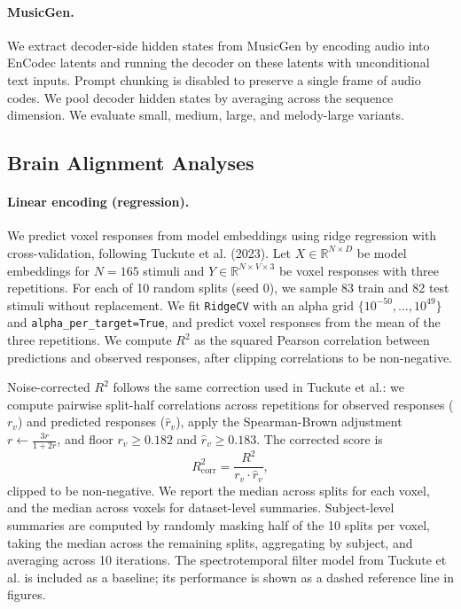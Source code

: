 \paragraph{MusicGen.}
We extract decoder-side hidden states from MusicGen by encoding audio into EnCodec latents and running the decoder on these latents with unconditional text inputs. Prompt chunking is disabled to preserve a single frame of audio codes. We pool decoder hidden states by averaging across the sequence dimension. We evaluate small, medium, large, and melody-large variants.

\subsection{Brain Alignment Analyses}
\paragraph{Linear encoding (regression).}
We predict voxel responses from model embeddings using ridge regression with cross-validation, following Tuckute et al. (2023). Let $X \in \mathbb{R}^{N \times D}$ be model embeddings for $N=165$ stimuli and $Y \in \mathbb{R}^{N \times V \times 3}$ be voxel responses with three repetitions. For each of 10 random splits (seed 0), we sample 83 train and 82 test stimuli without replacement. We fit \texttt{RidgeCV} with an alpha grid $\{10^{-50},\dots,10^{49}\}$ and \texttt{alpha\_per\_target=True}, and predict voxel responses from the mean of the three repetitions. We compute $R^2$ as the squared Pearson correlation between predictions and observed responses, after clipping correlations to be non-negative. 

Noise-corrected $R^2$ follows the same correction used in Tuckute et al.: we compute pairwise split-half correlations across repetitions for observed responses ($r_v$) and predicted responses ($\hat{r}_v$), apply the Spearman-Brown adjustment $r \leftarrow \frac{3r}{1+2r}$, and floor $r_v \ge 0.182$ and $\hat{r}_v \ge 0.183$. The corrected score is
\[
R^2_{\mathrm{corr}} = \frac{R^2}{r_v \cdot \hat{r}_v},
\]
clipped to be non-negative. We report the median across splits for each voxel, and the median across voxels for dataset-level summaries. Subject-level summaries are computed by randomly masking half of the 10 splits per voxel, taking the median across the remaining splits, aggregating by subject, and averaging across 10 iterations. The spectrotemporal filter model from Tuckute et al. is included as a baseline; its performance is shown as a dashed reference line in figures.

